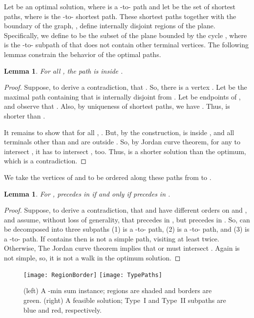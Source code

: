 \documentclass[11pt,twoside]{article}
\newtheorem{lemma}[theorem]{Lemma}
\begin{document}
Let  be an optimal solution, where  is a -to- path and let  be the set of shortest paths, where  is the -to- shortest path.
These shortest paths together with the boundary of the graph, , define internally disjoint regions of the plane.  Specifically, we define  to be the subset of the plane bounded by the cycle , where  is the -to- subpath of  that does not contain other terminal vertices.
The following lemmas constrain the behavior of the optimal paths.

\begin{lemma}
\label{lem:sp_in_region}
For all , the path  is inside .
\end{lemma}
\begin{proof}
Suppose, to derive a contradiction, that .
So, there is a vertex .  Let  be the maximal path containing  that is internally disjoint from .  Let  be endpoints of , and observe that .  Also, by uniqueness of shortest paths, we have .  Thus,  is shorter than .  

It remains to show that  for all , .  But, by the construction,  is inside , and all terminals other than  and  are outside .  So, by Jordan curve theorem, for any  to intersect , it has to intersect , too.  Thus,  is a shorter solution than the optimum, which is a contradiction.
\end{proof}

\noindent We take the vertices of  and  to be ordered along these paths from  to .

\begin{lemma}
\label{lem:pqSameOrder}
For ,  precedes  in  if and only if  precedes  in .
\end{lemma}
\begin{proof}
Suppose, to derive a contradiction, that  and  have different orders on  and , and assume, without loss of generality, that  precedes  in , but  precedes  in .  So,  can be decomposed into three subpaths (1)  is a -to- path, (2)  is a -to- path, and (3)  is a -to- path.  If  contains  then  is not a simple path, visiting  at least twice. Otherwise, The Jordan curve theorem implies that  or  must intersect .  Again  is not simple, so, it is not a walk in the optimum solution.
\end{proof}

\begin{figure}[tbh]
  \centering
    \texttt{[image: RegionBorder]}\qquad\qquad
    \texttt{[image: TypePaths]}
      \caption{(left) A -min sum instance; regions are shaded and borders are green. (right) A feasible solution; Type~I and Type~II subpaths are blue and red, respectively.}
  \label{fig:4-Disj}
\end{figure}
\end{document}
